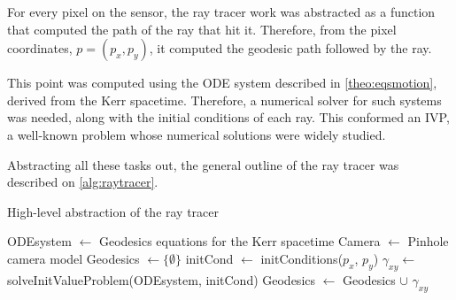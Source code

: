 For every pixel on the sensor, the ray tracer work was abstracted as a function that computed the path of the ray that hit it. Therefore, from the pixel coordinates, $p = (p_x, p_y)$, it computed the geodesic path followed by the ray.

This point was computed using the \ac{ODE} system described in \autoref{theo:eqsmotion}, derived from the Kerr spacetime. Therefore, a numerical solver for such systems was needed, along with the initial conditions of each ray. This conformed an \ac{IVP}, a well-known problem whose numerical solutions were widely studied.

Abstracting all these tasks out, the general outline of the ray tracer was described on \autoref{alg:raytracer}.

\begin{algorithm}
	\caption{High-level abstraction of the ray tracer}
	\label{alg:raytracer}
	\begin{algorithmic}[1]
		\State ODEsystem $\gets$ Geodesics equations for the Kerr spacetime
		\State Camera $\gets$ Pinhole camera model
		\State Geodesics $\gets \{\emptyset\}$
		\State initCond $\gets$ initConditions($p_x$, $p_y$)
		\State $\gamma_{xy} \gets$ solveInitValueProblem(ODEsystem, initCond)
		\State Geodesics $\gets$ Geodesics $\cup$ $\gamma_{xy}$
		\EndFor
		\EndFunction
	\end{algorithmic}
\end{algorithm}


